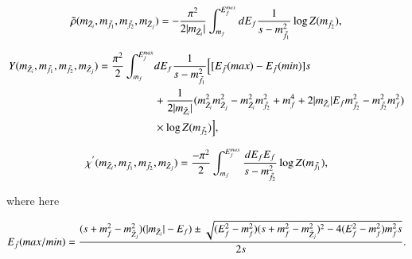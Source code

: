 \documentclass[final,3p,times,pdflatex]{elsarticle}
\begin{document}
\begin{equation} \label{rhotildaintegral}
\tilde{\rho}(m_{\tilde{Z}_i},m_{\tilde{f}_1},m_{\tilde{f}_2},m_{\tilde{Z}_j}) = -{\pi^2 \over 2 |m_{\tilde{Z}_i}|} \int_{m_{f}}^{E^{max}_{f}} dE_f {1 \over s-m_{\tilde{f}_1}^2} \log Z(m_{\tilde{f}_2}) ,
\end{equation}


\begin{equation} \label{Yintegral}
\begin{aligned}
Y(m_{\tilde{Z}_i},m_{\tilde{f}_1},m_{\tilde{f}_2},m_{\tilde{Z}_j}) = {\pi^2 \over 2} \int_{m_{f}}^{E^{max}_{f}} & dE_f {1 \over s-m_{\tilde{f}_1}^2}\Big[[E_{\bar{f}}(max) - E_{\bar{f}}(min)]s \\ & + {1 \over 2|m_{\tilde{Z}_i}|}(m_{\tilde{Z}_i}^2 m_{\tilde{Z}_j}^2 - m_{\tilde{Z}_i}^2 m_{\tilde{f}_2}^2 + m_{f}^4 + 2|m_{\tilde{Z}_i}|E_{f}m_{\tilde{f}_2}^2 - m_{\tilde{f}_2}^2 m_{f}^2) \\ & \times \log Z(m_{\tilde{f}_2})\Big] ,
\end{aligned}
\end{equation}


\begin{equation} \label{chiprimeintegral}
\chi^{'}(m_{\tilde{Z}_i},m_{\tilde{f}_1},m_{\tilde{f}_2},m_{\tilde{Z}_j}) = {-\pi^2 \over 2} \int_{m_{f}}^{E^{max}_{f}} {dE_f E_{f} \over s - m_{\tilde{f}_2}^2} \log Z(m_{\tilde{f}_1}),
\end{equation}

where here

\begin{equation}
E_{\bar{f}}(max/min) = {(s + m_{f}^2 - m_{\tilde{Z}_j}^2)(|m_{\tilde{Z}_i}|-E_{f}) \pm \sqrt{(E_{f}^2 - m_{f}^2)(s + m_{f}^2 - m_{\tilde{Z}_j}^2)^2 - 4(E_{f}^2 - m_{f}^2)m_{f}^2 s} \over 2s}.
\end{equation}
\end{document}
